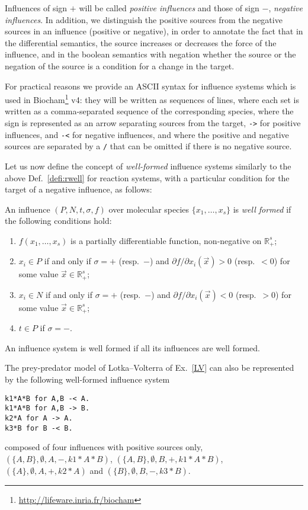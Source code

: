 \documentclass{llncs}
\begin{document}
Influences of sign $+$ will be called \emph{positive influences} and those of
sign $-$, \emph{negative influences}.
In addition, we distinguish the positive sources from the negative sources in an influence (positive or negative),
in order to annotate the fact that in the differential semantics,
the source increases or decreases the force of the influence,
and in the boolean semantics with negation whether the source or the negation of the source
is a condition for a change in the target.

For practical reasons we provide an ASCII syntax for influence systems which is used in Biocham\footnote{\url{http://lifeware.inria.fr/biocham}} v4: they
will be written as sequences of lines, where each set is written as a
comma-separated sequence of the corresponding species, where the sign is
represented as an arrow separating sources from the target, \lstinline|->| for positive influences,
and \lstinline+-<+ for negative influences, and where the positive and negative sources are separated
by a \lstinline|/| that can be omitted if there is no negative source.

Let us now define the concept of \emph{well-formed} influence
systems similarly to the above Def.~\ref{defi:rwell} for reaction systems,
with a particular condition for the target of a negative influence, as follows:

\begin{definition}
   An influence $(P, N, t, \sigma, f)$
over molecular species $\{x_1,\dots,x_s\}$
is \emph{well formed} if the following conditions hold:
\begin{enumerate}
\item $f(x_1,\dots,x_s)$ is a partially differentiable function, non-negative
   on $\mathbb{R}_+^s$;
\item $x_i\in P$ if and only if $\sigma = +$ (resp.\ $-$) and
   ${\partial {f}}/ {\partial x_i}(\vec x)>0$ (resp.\ $<0$) for some value
   $\vec x\in\mathbb{R}_+^s$;
\item $x_i\in N$ if and only if $\sigma = +$ (resp.\ $-$) and
   ${\partial {f}}/ {\partial x_i}(\vec x)<0$ (resp.\ $>0$) for some value
  $\vec x\in\mathbb{R}_+^s$;
  \item $t\in P$ if $\sigma=-$.
\end{enumerate}
An influence system is well formed if all its influences are
well formed.
\end{definition}

\begin{example}\label{exLV}
   The prey-predator model of Lotka--Volterra of Ex.~\ref{LV} can also be represented by the following well-formed influence system %
   \begin{lstlisting}
k1*A*B for A,B -< A.
k1*A*B for A,B -> B.
k2*A for A -> A.
k3*B for B -< B.
   \end{lstlisting}
   composed of four influences with positive sources only,
   $(\{A, B\}, \emptyset, A, -, k1*A*B)$, $(\{A, B\}, \emptyset, B, +, k1*A*B)$, $(\{A\}, \emptyset, A, +, k2*A)$ and $(\{B\}, \emptyset, B, -, k3*B)$.

\end{example}
\end{document}
